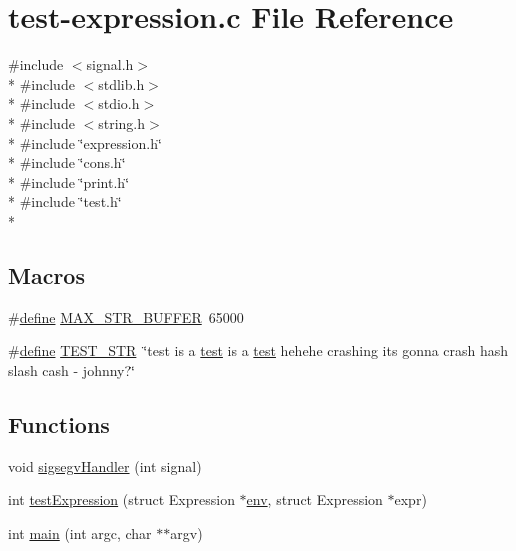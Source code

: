 \hypertarget{test-expression_8c}{\section{test-\/expression.c File Reference}
\label{test-expression_8c}
}
{\ttfamily \#include $<$signal.\+h$>$}\\*
{\ttfamily \#include $<$stdlib.\+h$>$}\\*
{\ttfamily \#include $<$stdio.\+h$>$}\\*
{\ttfamily \#include $<$string.\+h$>$}\\*
{\ttfamily \#include \char`\"{}expression.\+h\char`\"{}}\\*
{\ttfamily \#include \char`\"{}cons.\+h\char`\"{}}\\*
{\ttfamily \#include \char`\"{}print.\+h\char`\"{}}\\*
{\ttfamily \#include \char`\"{}test.\+h\char`\"{}}\\*
\subsection*{Macros}
\begin{DoxyCompactItemize}
\item 
\#\hyperlink{nativefunctions_8h_a06f28a72fd48e4a07d1d9e541bad304a}{define} \hyperlink{test-expression_8c_a1501fcc30671da220e9a1a5d7431cd1e}{M\+A\+X\+\_\+\+S\+T\+R\+\_\+\+B\+U\+F\+F\+E\+R}~65000
\item 
\#\hyperlink{nativefunctions_8h_a06f28a72fd48e4a07d1d9e541bad304a}{define} \hyperlink{test-expression_8c_a6a34912fc5493f286fedf636a498bc79}{T\+E\+S\+T\+\_\+\+S\+T\+R}~\char`\"{}test is a \hyperlink{test_8h_a3579ec9342b5c608ec759101a87e75cf}{test} is a \hyperlink{test_8h_a3579ec9342b5c608ec759101a87e75cf}{test} hehehe crashing its gonna crash hash slash cash -\/ johnny?\char`\"{}
\end{DoxyCompactItemize}
\subsection*{Functions}
\begin{DoxyCompactItemize}
\item 
void \hyperlink{test-expression_8c_a734e4e41a32aae33af981f1df614bbf7}{sigsegv\+Handler} (int signal)
\item 
int \hyperlink{test-expression_8c_a020d6b502c070bcc388186fde85a9fb7}{test\+Expression} (struct Expression $\ast$\hyperlink{test-env_8c_a57378699c80a40509e334ce55c228738}{env}, struct Expression $\ast$expr)
\item 
int \hyperlink{test-expression_8c_a3c04138a5bfe5d72780bb7e82a18e627}{main} (int argc, char $\ast$$\ast$argv)
\end{DoxyCompactItemize}


